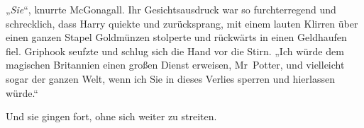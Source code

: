 „\emph{Sie}“, knurrte McGonagall. Ihr Gesichtsausdruck war so furchterregend und schrecklich, dass Harry quiekte und zurücksprang, mit einem lauten Klirren über einen ganzen Stapel Goldmünzen stolperte und rückwärts in einen Geldhaufen fiel. Griphook seufzte und schlug sich die Hand vor die Stirn. „Ich würde dem magischen Britannien einen großen Dienst erweisen, Mr~Potter, und vielleicht sogar der ganzen Welt, wenn ich Sie in dieses Verlies sperren und hierlassen würde.“

Und sie gingen fort, ohne sich weiter zu streiten.

